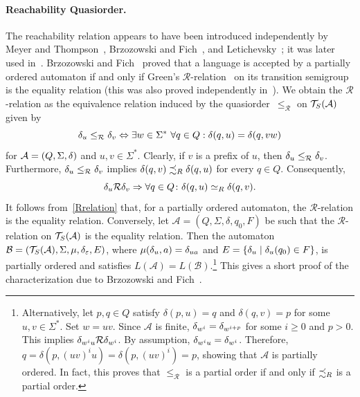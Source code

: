 \label{def:R-quasiorder}
\paragraph{Reachability Quasiorder.}
The reachability relation appears to have been introduced independently
by Meyer and Thompson~\cite{DBLP:journals/mst/MeyerT69},
Brzozowski and Fich~\cite{DBLP:journals/jcss/BrzozowskiF80},
and Letichevsky~\cite{Letichevsky65}; it was later used
in~\cite{DBLP:journals/tcs/Ito12}.
Brzozowski and Fich~\cite{DBLP:journals/jcss/BrzozowskiF80}
proved that a language is accepted by a partially ordered automaton
if and only if Green's $\mathcal R$-relation~\cite{Green51}
on its transition semigroup is the equality relation
(this was also proved independently in~\cite[Thm.~5.1]{DBLP:journals/jcss/CohenPP93}).
We obtain the $\mathcal R$-relation as the equivalence relation induced by
the quasiorder~$\le_{\mathcal R}$ on $\mathcal T_S(\mathcal A)$ given by
\[
{\delta}_{u} \le_{\mathcal R} {\delta}_{v}
\Leftrightarrow
\exists w \in \Sigma^* \ \forall q \in Q :
\delta(q,u) = \delta(q,vw)
\]
for $\mathcal A = (Q, \Sigma, \delta)$ and $u,v \in \Sigma^*$.
Clearly, if $v$ is a prefix of $u$, then
${\delta}_{u} \le_{\mathcal R} {\delta}_{v}$.
Furthermore,
${\delta}_{u} \le_{\mathcal R} {\delta}_{v}$
implies
$\delta(q,v) \precsim_R \delta(q,u)$
for every $q \in Q$. Consequently,
\begin{equation}\label{Rrelation}
	{\delta}_{u} \mathcal R {\delta}_{v}
	\Rightarrow
	\forall q \in Q \colon
	\delta(q,u)
	\simeq_R
	\delta(q,v).
\end{equation}
It follows from~\cref{Rrelation} that, for a partially ordered automaton,
the $\mathcal R$-relation is the equality relation.
Conversely, let
$\mathcal A = (Q, \Sigma, \delta, q_0, F)$
be such that the $\mathcal R$-relation on $\mathcal T_S(\mathcal A)$
is the equality relation.
Then the automaton
$\mathcal B = (\mathcal T_S(\mathcal A), \Sigma, \mu,
{\delta}_{\varepsilon}, E)$,
where
$\mu({\delta}_{u}, a) = {\delta}_{ua}$
and
$E = \{{\delta}_{u} \mid {\delta}_{u}(q_0) \in F\}$,
is partially ordered and satisfies
$L(\mathcal A) = L(\mathcal B)$.\footnote{Alternatively, let
	$p,q \in Q$ satisfy
	$\delta(p,u)=q$ and $\delta(q,v)=p$
	for some $u,v\in\Sigma^*$.
	Set $w=uv$.
	Since $\mathcal A$ is finite,
	${\delta}_{w^i}={\delta}_{w^{i+p}}$
	for some $i\ge0$ and $p>0$.
	This implies
	${\delta}_{w^iu}\mathcal R{\delta}_{w^i}$.
	By assumption,
	${\delta}_{w^iu}={\delta}_{w^i}$.
	Therefore,
	$q=\delta(p,(uv)^iu)=\delta(p,(uv)^i)=p$,
	showing that $\mathcal A$ is partially ordered.
	In fact, this proves that
	$\le_{\mathcal R}$ is a partial order
	if and only if $\precsim_R$ is a partial order.}
This gives a short proof of the characterization due to
Brzozowski and Fich~\cite{DBLP:journals/jcss/BrzozowskiF80}.

